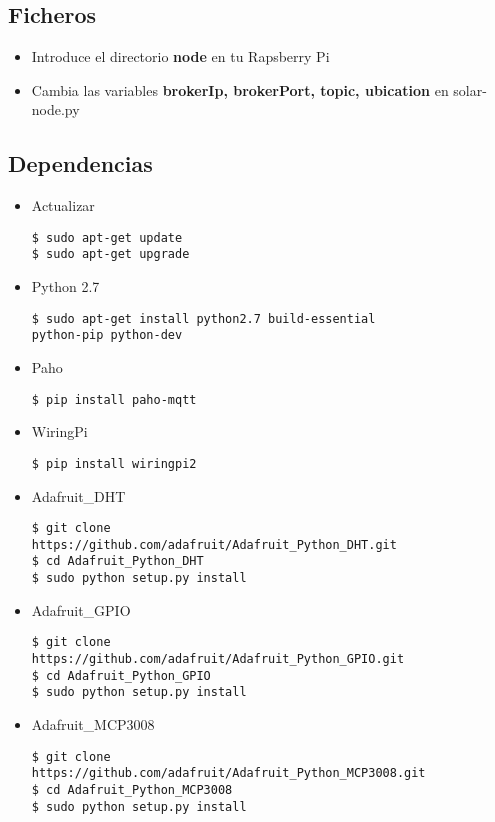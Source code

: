 \subsection{Ficheros}
\label{makereference5.1.3}
	\begin{itemize}
		\item Introduce el directorio \textbf{node} en tu Rapsberry Pi
		\item Cambia las variables \textbf{brokerIp, brokerPort, topic, ubication} en solar-node.py
	\end{itemize}

\subsection{Dependencias}
\label{makereference5.1.4}
	\begin{itemize}
		\item Actualizar
\lstset{language=bash}
\begin{lstlisting}[frame=single]
$ sudo apt-get update
$ sudo apt-get upgrade
\end{lstlisting}
		\item Python 2.7
\begin{lstlisting}[frame=single]
$ sudo apt-get install python2.7 build-essential 
python-pip python-dev
\end{lstlisting}
		\item Paho
\begin{lstlisting}[frame=single]
$ pip install paho-mqtt
\end{lstlisting}
		\item WiringPi
\begin{lstlisting}[frame=single]
$ pip install wiringpi2
\end{lstlisting}
		\item Adafruit\_DHT
\begin{lstlisting}[frame=single]
$ git clone 
https://github.com/adafruit/Adafruit_Python_DHT.git
$ cd Adafruit_Python_DHT
$ sudo python setup.py install
\end{lstlisting}
		\item Adafruit\_GPIO
\begin{lstlisting}[frame=single]
$ git clone 
https://github.com/adafruit/Adafruit_Python_GPIO.git
$ cd Adafruit_Python_GPIO
$ sudo python setup.py install
\end{lstlisting}
		\item Adafruit\_MCP3008
\begin{lstlisting}[frame=single]
$ git clone 
https://github.com/adafruit/Adafruit_Python_MCP3008.git
$ cd Adafruit_Python_MCP3008
$ sudo python setup.py install
\end{lstlisting}
	\end{itemize}

